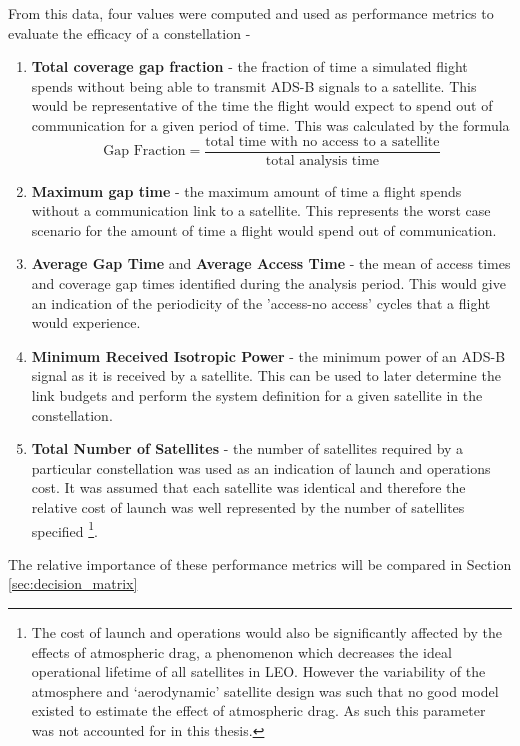 From this data, four values were computed and used as performance metrics to evaluate the efficacy of a constellation - 
\begin{enumerate}
	\item \textbf{Total coverage gap fraction} - the fraction of time a simulated flight spends without being able to transmit ADS-B signals to a satellite. This would be representative of the time the flight would expect to spend out of communication for a given period of time. This was calculated by the formula
	\[ \text{Gap Fraction} = \dfrac{\text{total time with no access to a satellite}}{\text{total analysis time}}\]
	\item \textbf{Maximum gap time} - the maximum amount of time a flight spends without a communication link to a satellite. This represents the worst case scenario for the amount of time a flight would spend out of communication.
	\item \textbf{Average Gap Time} and \textbf{Average Access Time} - the mean of access times and coverage gap times identified during the analysis period. This would give an indication of the periodicity of the 'access-no access' cycles that a flight would experience.
	\item \textbf{Minimum Received Isotropic Power} - the minimum power of an ADS-B signal as it is received by a satellite. This can be used to later determine the link budgets and perform the system definition for a given satellite in the constellation.
	\item \textbf{Total Number of Satellites} - the number of satellites required by a particular constellation was used as an indication of launch and operations cost. It was assumed that each satellite was identical and therefore the relative cost of launch was well represented by the number of satellites specified \footnote{The cost of launch and operations would also be significantly affected by the effects of atmospheric drag, a phenomenon which decreases the ideal operational lifetime of all satellites in LEO. However the variability of the atmosphere and `aerodynamic' satellite design was such that no good model existed to estimate the effect of atmospheric drag. As such this parameter was not accounted for in this thesis.}.
\end{enumerate} 

The relative importance of these performance metrics will be compared in Section \ref{sec:decision_matrix}

